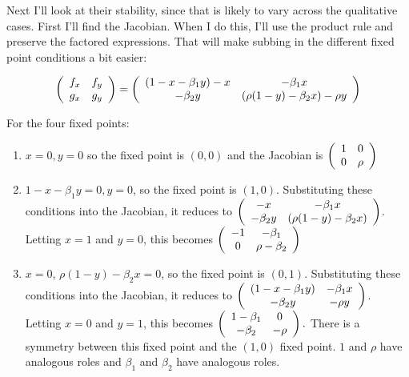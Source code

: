 \documentclass[12pt,letterpaper]{exam}
\begin{document}
\begin{questions}
\begin{parts}
\begin{solution}
Next I'll look at their stability, since that is likely to vary across the qualitative cases.  First I'll find the Jacobian.  When I do this, I'll use the product rule and preserve the factored expressions.  That will make subbing in the different fixed point conditions a bit easier:

\[\left(\begin{array}{c c} f_x & f_y \\ g_x  & g_y \end{array}\right) = \left(\begin{array}{c c} (1-x-\beta_1 y) - x & -\beta_1 x \\ -\beta_2 y & (\rho(1-y) - \beta_2 x) - \rho y  \end{array}\right) \]

For the four fixed points:
\begin{enumerate}
\item $x = 0, y = 0$ so the fixed point is $(0,0)$ and the Jacobian is $\left(\begin{array}{c c} 1 & 0 \\ 0 & \rho  \end{array}\right) $
\item  $1 - x - \beta_1 y = 0, y = 0$, so the fixed point is $(1,0)$.  Substituting these conditions into the Jacobian, it reduces to $\left(\begin{array}{c c}  - x & -\beta_1 x \\ -\beta_2 y & (\rho(1-y) - \beta_2 x)  \end{array}\right)$.  Letting $x = 1$ and $y = 0$, this becomes $\left(\begin{array}{c c}  -1 & -\beta_1 \\ 0 & \rho - \beta_2  \end{array}\right)$
\item   $x = 0$, $\rho(1-y)-\beta_2 x = 0$, so the fixed point is $(0,1)$. Substituting these conditions into the Jacobian, it reduces to $\left(\begin{array}{c c} (1-x-\beta_1 y) & -\beta_1 x \\ -\beta_2 y & - \rho y  \end{array}\right) $.  Letting $x =0$ and $y=1$, this becomes $\left(\begin{array}{c c} 1-\beta_1 & 0 \\ -\beta_2 & - \rho   \end{array}\right).$  There is a symmetry between this fixed point and the $(1,0)$ fixed point.  $1$ and $\rho$ have analogous roles and $\beta_1$ and $\beta_2$ have analogous roles.


\end{enumerate}
\end{solution}
\end{parts}
\end{questions}
\end{document}
